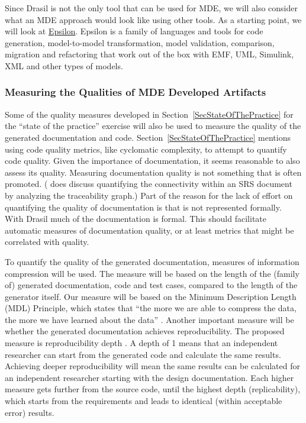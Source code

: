 \documentclass[12pt]{article}
\begin{document}
Since Drasil is not the only tool that can be used for MDE, we will also
consider what an MDE approach would look like using other tools.  As a starting
point, we will look at \href{https://www.eclipse.org/epsilon/}{Epsilon}.
Epsilon is a family of languages and tools for code generation, model-to-model
transformation, model validation, comparison, migration and refactoring that
work out of the box with EMF, UML, Simulink, XML and other types of models.


\subsubsection{Measuring the Qualities of MDE Developed
  Artifacts} \label{SecQOfMDEArtifacts}

Some of the quality measures developed in Section~\ref{SecStateOfThePractice}
for the ``state of the practice'' exercise will also be used to measure the
quality of the generated documentation and code.
Section~\ref{SecStateOfThePractice} mentions using code quality metrics, like
cyclomatic complexity, to attempt to quantify code quality.  Given the
importance of documentation, it seems reasonable to also assess its quality.
Measuring documentation quality is not something that is often promoted.
(\citet{Sanga2003} does discuss quantifying the connectivity within an SRS
document by analyzing the traceability graph.)  Part of the reason for the lack
of effort on quantifying the quality of documentation is that is not represented
formally.  With Drasil much of the documentation is formal.  This should
facilitate automatic measures of documentation quality, or at least metrics that
might be correlated with quality.

To quantify the quality of the generated documentation, measures of information
compression will be used.  The measure will be based on the length of the
(family of) generated documentation, code and test cases, compared to the length
of the generator itself.  Our measure will be based on the Minimum Description
Length (MDL) Principle, which states that ``the more we are able to compress the
data, the more we have learned about the data'' \citep{Grunwald2004}.  Another
important measure will be whether the generated documentation achieves
reproducibility. The proposed measure is reproducibility depth
\citep{Soergel2014}.  A depth of 1 means that an independent researcher can
start from the generated code and calculate the same results.  Achieving deeper
reproducibility will mean the same results can be calculated for an independent
researcher starting with the design documentation.  Each higher measure gets
further from the source code, until the highest depth (replicability), which
starts from the requirements and leads to identical (within acceptable error)
results.
\end{document}

